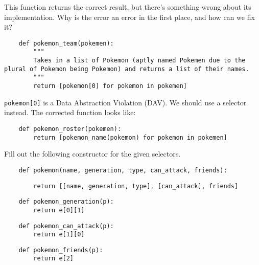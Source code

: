     
    \begin{blocksection}
    \question This function returns the correct result, but there's something wrong
    about its implementation. Why is the error an error in the first place, and how can we fix it?
    
    \begin{lstlisting}
    def pokemon_team(pokemen):
        """
        Takes in a list of Pokemon (aptly named Pokemen due to the plural of Pokemon being Pokemon) and returns a list of their names.
        """
        return [pokemon[0] for pokemon in pokemen]
    \end{lstlisting}
    \begin{solution}[1in]
    \lstinline{pokemon[0]} is a Data Abstraction Violation (DAV).
    We should use a selector instead.
    The corrected function looks like:
    \begin{lstlisting}
    def pokemon_roster(pokemen):
        return [pokemon_name(pokemon) for pokemon in pokemen]
    \end{lstlisting}
    \end{solution}
    
    \end{blocksection}
    
    
    \begin{blocksection}
    \question Fill out the following constructor for the given selectors.
    
    \begin{lstlisting}
    def pokemon(name, generation, type, can_attack, friends):
    \end{lstlisting}
    \begin{solution}[1in]
    \begin{lstlisting}
        return [[name, generation, type], [can_attack], friends]
    \end{lstlisting}
    \end{solution}
    
    \begin{lstlisting}
    def pokemon_generation(p):
        return e[0][1]
    \end{lstlisting}
    
    \begin{lstlisting}
    def pokemon_can_attack(p):
        return e[1][0]
    \end{lstlisting}
    
    \begin{lstlisting}
    def pokemon_friends(p):
        return e[2]
    \end{lstlisting}
    
    \end{blocksection}
    
